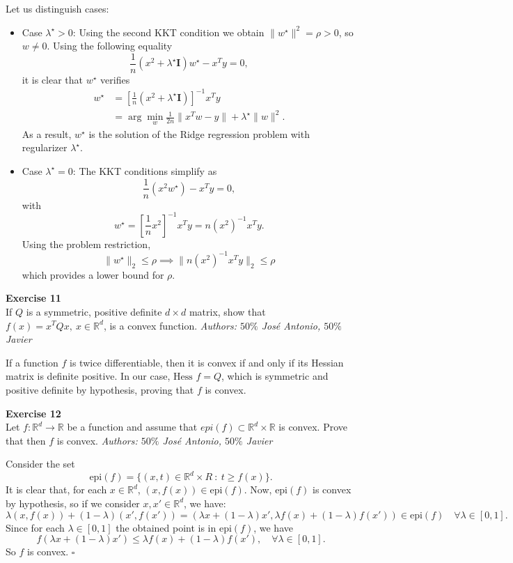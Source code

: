 \documentclass[11pt,table]{article}
\newcommand{\qed}{\hfill $\square$}
\newenvironment{problem}[2][Exercise]
{ \begin{mdframed}[backgroundcolor=gray!20] \textbf{#1 #2} \\}
	{\hspace{0.0cm}\newline\newline \emph{Authors: \(50\%\) José Antonio, \(50\%\) Javier}  \end{mdframed}}
\newcommand\R{\mathbb R}
\begin{document}
Let us distinguish cases:

\begin{itemize}
	\item Case $\lambda^\star > 0$: Using the second KKT condition we obtain \(\|w^\star\|^2 = \rho > 0\), so \(w \neq 0\).
	      Using the following equality
	      \[
		      \frac{1}{n} (x^2 + \lambda^\star \bm{I})w^\star - x^Ty = 0,
	      \]
	      it is clear that \(w^\star\) verifies
	      \[\begin{aligned}
			      w^\star & = \left[ \frac{1}{n} (x^2 + \lambda^\star \bm{I})\right]^{-1}x^T y  \\
			              & = \arg \min_{w} \frac{1}{2n} \|x^T w - y\| + \lambda^\star \|w\|^2.
		      \end{aligned}\]
	      As a result, \(w^\star\) is the solution of the Ridge regression problem with regularizer \(\lambda^\star\).
	\item Case \(\lambda^\star = 0\): The KKT conditions simplify as
	      \[
		      \frac{1}{n} \left(x^2w^\star\right) - x^Ty = 0,
	      \]
	      with
	      \[
		      w^\star = \left[ \frac{1}{n} x^2\right]^{-1}x^T y = n(x^2)^{-1} x^Ty.
	      \]
	      Using the problem restriction,
	      \[
		      \|w^\star\|_2 \leq \rho \implies \| n(x^2)^{-1} x^T y\|_2 \leq \rho
	      \]
	      which provides a lower bound for $\rho$. \\
\end{itemize}



\begin{problem}{11}
If \( Q \) is a symmetric, positive definite \( d \times d \) matrix, show that \( f(x) = x^TQx, \ x \in \mathbb{R}^d \), is a convex function.
\end{problem}

If a function $f$ is twice differentiable, then it is convex if and only if its Hessian matrix is definite positive. In our case, $\text{Hess }f = Q$, which is symmetric and positive definite by hypothesis, proving that $f$ is convex. \\

\begin{problem}{12}
Let \( f:\mathbb{R}^d \to \mathbb{R} \)  be a function and assume that \( epi(f) \subset \mathbb{R}^d \times \mathbb{R} \)  is convex. Prove that then \( f \)  is convex.
\end{problem}

Consider the set
\[
	\text{epi}(f) = \{(x,t)\in \R^d \times R \ : \ t \geq f(x)\}.
\]
It is clear that, for each \(x \in \R^d\), \((x,f(x))\in \text{epi}(f)\). Now, \(\text{epi}(f)\) is convex by hypothesis, so if we consider \(x,x'\in \R^d\), we have:
\[
	\lambda(x,f(x)) + (1-\lambda)(x',f(x')) = \left(\lambda x + (1-\lambda)x', \lambda f(x) + (1-\lambda)f(x')\right) \in \text{epi}(f)\quad \forall \lambda \in [0,1].
\]
Since for each \(\lambda \in [0,1]\) the obtained point is in \(\text{epi}(f)\), we have
\[
	f(\lambda x + (1-\lambda)x') \leq \lambda f(x) + (1-\lambda)f(x'), \quad \forall \lambda \in [0,1].
\]
So \(f\) is convex. \qed \\
\end{document}
